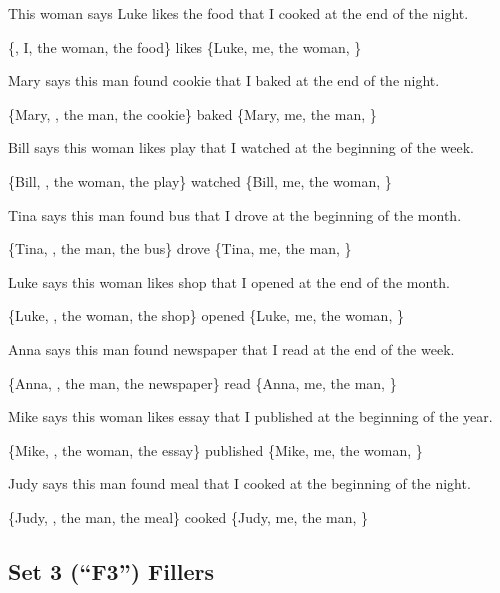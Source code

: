 \pex %
\a[label=S] This woman says Luke likes the food that I cooked at the end of the night.\par\nobreak
\a[label=Q] \{, I, the woman, the food\} likes \{Luke, me, the woman, \}
\xe

\pex %
\a[label=S] \ljudge{*}Mary says this man found cookie that I baked at the end of the night.\par\nobreak
\a[label=Q] \{Mary, , the man, the cookie\} baked \{Mary, me, the man, \}
\xe

\pex %
\a[label=S] \ljudge{*}Bill says this woman likes play that I watched at the beginning of the week.\par\nobreak
\a[label=Q] \{Bill, , the woman, the play\} watched \{Bill, me, the woman, \}
\xe

\pex %
\a[label=S] \ljudge{*}Tina says this man found bus that I drove at the beginning of the month.\par\nobreak
\a[label=Q] \{Tina, , the man, the bus\} drove \{Tina, me, the man, \}
\xe

\pex %
\a[label=S] \ljudge{*}Luke says this woman likes shop that I opened at the end of the month.\par\nobreak
\a[label=Q] \{Luke, , the woman, the shop\} opened \{Luke, me, the woman, \}
\xe

\pex %
\a[label=S] \ljudge{*}Anna says this man found newspaper that I read at the end of the week.\par\nobreak
\a[label=Q] \{Anna, , the man, the newspaper\} read \{Anna, me, the man, \}
\xe

\pex %
\a[label=S] \ljudge{*}Mike says this woman likes essay that I published at the beginning of the year.\par\nobreak
\a[label=Q] \{Mike, , the woman, the essay\} published \{Mike, me, the woman, \}
\xe

\pex %
\a[label=S] \ljudge{*}Judy says this man found meal that I cooked at the beginning of the night.\par\nobreak
\a[label=Q] \{Judy, , the man, the meal\} cooked \{Judy, me, the man, \}
\xe

\subsection{Set 3 (``F3'') Fillers}

